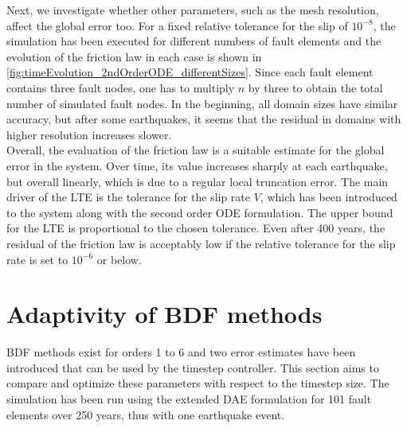 Next, we investigate whether other parameters, such as the mesh resolution, affect the global error too. For a fixed relative tolerance for the slip of $10^{-8}$, the simulation has been executed for different numbers of fault elements and the evolution of the friction law in each case is shown in \autoref{fig:timeEvolution_2ndOrderODE_differentSizes}. Since each fault element contains three fault nodes, one has to multiply $n$ by three to obtain the total number of simulated fault nodes. In the beginning, all domain sizes have similar accuracy, but after some earthquakes, it seems that the residual in domains with higher resolution increases slower. \\

Overall, the evaluation of the friction law is a suitable estimate for the global error in the system. Over time, its value increases sharply at each earthquake, but overall linearly, which is due to a regular local truncation error. The main driver of the LTE is the tolerance for the slip rate $V$, which has been introduced to the system along with the second order ODE formulation. The upper bound for the LTE is proportional to the chosen tolerance. Even after 400 years, the residual of the friction law is acceptably low if the relative tolerance for the slip rate is set to $10^{-6}$ or below.


\section{Adaptivity of BDF methods}
\label{sec:Results_BDFOrder}
BDF methods exist for orders 1 to 6 and two error estimates have been introduced that can be used by the timestep controller. This section aims to compare and optimize these parameters with respect to the timestep size. The simulation has been run using the extended DAE formulation for 101 fault elements over 250 years, thus with one earthquake event.


